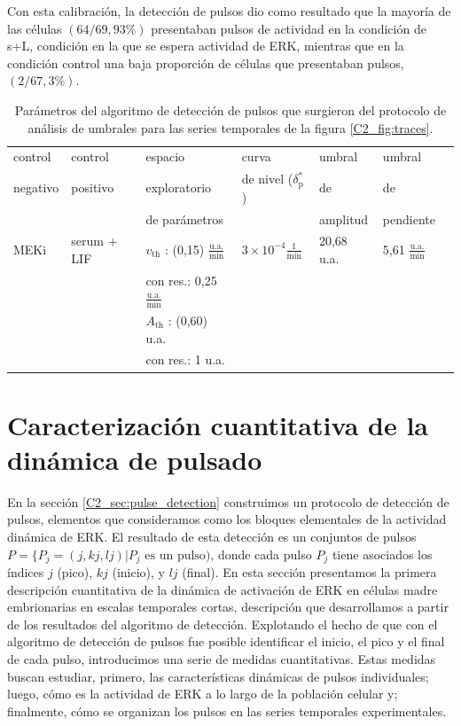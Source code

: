 \documentclass[./main.tex]{subfiles}
\begin{document}
Con esta calibración, la detección de pulsos dio como resultado que la mayoría de las células $(64/69, 93\%)$ presentaban pulsos de actividad en la condición de s+L, condición en la que se espera actividad de ERK, mientras que en la condición control una baja proporción de células que presentaban pulsos, $(2/67, 3\%)$.

\begin{table}[htbp]
\begin{adjustwidth}{-0.5in}{-0.5in}%
\centering
\begin{tabular}{|l|l|l|l|l|l|l|}
\hline
 control & control & espacio & curva & umbral & umbral \\
 negativo & positivo & exploratorio & de nivel ($\delta_\text{p}^*$) & de & de \\
 &  & de parámetros & & amplitud & pendiente \\
\hline \hline
MEKi & serum + LIF & $v_{\text{th}}$ : (0,15) $\frac{\text{u.a.}}{\text{min}}$ & $3 \times 10^{-4} \frac{1}{\text{min}}$ & 20,68 u.a. & 5,61 $\frac{\text{u.a.}}{\text{min}}$ \\
 & & con res.: 0,25 $\frac{\text{u.a.}}{\text{min}}$ &  & & \\
 & & $A_{\text{th}}$ : (0,60) u.a. & & & \\
 & & con res.: 1 u.a. & & & \\
\hline
\end{tabular}
\end{adjustwidth}
\caption{Parámetros del algoritmo de detección de pulsos que surgieron del protocolo de análisis de umbrales para las series temporales de la figura \ref{C2_fig:traces}.}
\label{C2_tab:th_WT}
\end{table}


\section{Caracterización cuantitativa de la dinámica de pulsado}
\label{C2_sec:analisis}

En la sección \ref{C2_sec:pulse_detection} construimos un protocolo de detección de pulsos, elementos que consideramos como los bloques elementales de la actividad dinámica de ERK. El resultado de esta detección es un conjuntos de pulsos $P= \lbrace P_j=(j, kj, lj) | P_j \text{ es un pulso})$, donde cada pulso $P_j$ tiene asociados los índices $j$ (pico), $kj$ (inicio), y $lj$ (final). En esta sección presentamos la primera descripción cuantitativa de la dinámica de activación de ERK en células madre embrionarias en escalas temporales cortas, descripción que desarrollamos a partir de los resultados del algoritmo de detección. Explotando el hecho de que con el algoritmo de detección de pulsos fue posible identificar el inicio, el pico y el final de cada pulso, introducimos una serie de medidas cuantitativas. Estas medidas buscan estudiar, primero, las características dinámicas de pulsos individuales; luego, cómo es la actividad de ERK a lo largo de la población celular y; finalmente, cómo se organizan los pulsos en las series temporales experimentales.
 
\end{document}
